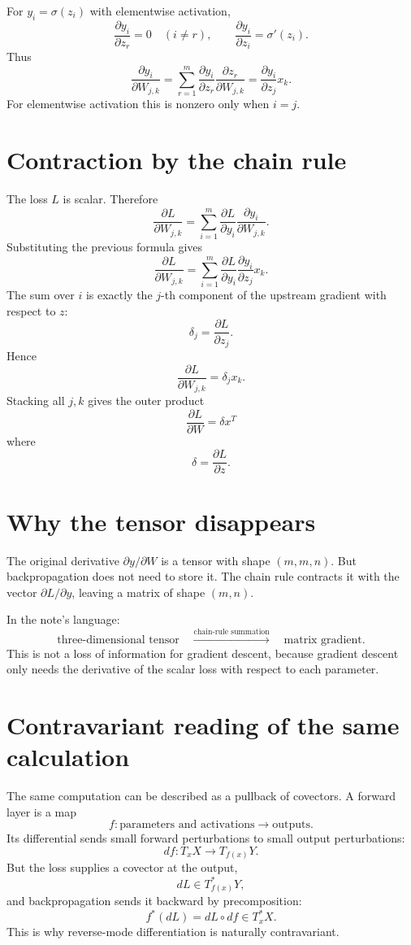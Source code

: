 For $y_i=\sigma(z_i)$ with elementwise activation,
\[
  \frac{\partial y_i}{\partial z_r}=0\quad(i\ne r),\qquad
  \frac{\partial y_i}{\partial z_i}=\sigma'(z_i).
\]
Thus
\[
  \frac{\partial y_i}{\partial W_{j,k}}
  =\sum_{r=1}^m
  \frac{\partial y_i}{\partial z_r}
  \frac{\partial z_r}{\partial W_{j,k}}
  =\frac{\partial y_i}{\partial z_j}x_k.
\]
For elementwise activation this is nonzero only when $i=j$.

\section{Contraction by the chain rule}

The loss $L$ is scalar.  Therefore
\[
  \frac{\partial L}{\partial W_{j,k}}
  =\sum_{i=1}^m
  \frac{\partial L}{\partial y_i}
  \frac{\partial y_i}{\partial W_{j,k}}.
\]
Substituting the previous formula gives
\[
  \frac{\partial L}{\partial W_{j,k}}
  =\sum_{i=1}^m
  \frac{\partial L}{\partial y_i}
  \frac{\partial y_i}{\partial z_j}x_k.
\]
The sum over $i$ is exactly the $j$-th component of the upstream gradient with respect to $z$:
\[
  \delta_j=\frac{\partial L}{\partial z_j}.
\]
Hence
\[
  \frac{\partial L}{\partial W_{j,k}}=\delta_jx_k.
\]
Stacking all $j,k$ gives the outer product
\[
  \boxed{\displaystyle
  \frac{\partial L}{\partial W}=\delta x^T
  }
\]
where
\[
  \delta=\frac{\partial L}{\partial z}.
\]

\section{Why the tensor disappears}

The original derivative $\partial y/\partial W$ is a tensor with shape $(m,m,n)$.  But backpropagation does not need to store it.  The chain rule contracts it with the vector $\partial L/\partial y$, leaving a matrix of shape $(m,n)$.

In the note's language:
\[
  \text{three-dimensional tensor}
  \quad\xrightarrow{\text{chain-rule summation}}
  \quad
  \text{matrix gradient}.
\]
This is not a loss of information for gradient descent, because gradient descent only needs the derivative of the scalar loss with respect to each parameter.

\section{Contravariant reading of the same calculation}

The same computation can be described as a pullback of covectors.  A forward layer is a map
\[
  f:\text{parameters and activations}\longrightarrow \text{outputs}.
\]
Its differential sends small forward perturbations to small output perturbations:
\[
  df:T_xX\to T_{f(x)}Y.
\]
But the loss supplies a covector at the output,
\[
  dL\in T_{f(x)}^*Y,
\]
and backpropagation sends it backward by precomposition:
\[
  f^*(dL)=dL\circ df\in T_x^*X.
\]
This is why reverse-mode differentiation is naturally contravariant.

